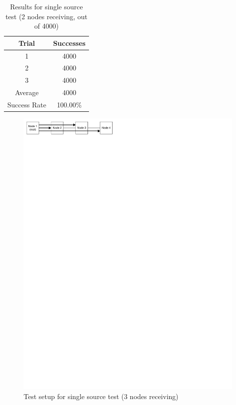 \begin{table}
	\begin{center}
		\setlength{\extrarowheight}{1.5pt}
		\caption{Results for single source test (2 nodes receiving, out of 4000)}
		\vspace{0.1cm}
		\begin{tabular} {|c|c|}
			\hline
			\textbf{Trial} & \textbf{Successes} \\
			\hline
			\hline
			1 & 4000 \\
			\hline
			2 & 4000 \\
			\hline
			3 & 4000 \\
			\hline
			\hline
			Average & 4000 \\
			\hline
			Success Rate & 100.00\% \\
			\hline
		\end{tabular}
		\label{tab:protocol:2_line_flood_test}
	\end{center}
\end{table}

 \begin{figure}[ptb]
	\begin{centering}
		\includegraphics{Protocol/Figures/protocol-3_line_flood_test.pdf}
		\caption{Test setup for single source test (3 nodes receiving)}
		\label{fig:protocol:3_line_flood_test}
	\end{centering}
\end{figure}

